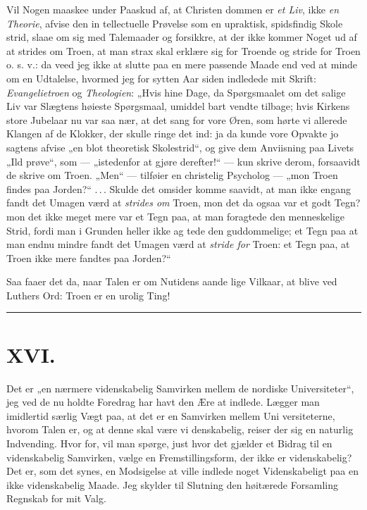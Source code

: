 \documentclass[12pt]{book}
\newcommand{\opage}[1]{\marginnote{\footnotesize\textit{[#1]}}}
\begin{document}
Vil Nogen maaskee under Paaskud af, at Christen\-%
dommen er \emph{et Liv}, ikke \emph{en Theorie}, afvise den in\-%
tellectuelle Prøvelse som en upraktisk, spidsfindig Skole\-%
strid, slaae om sig med Talemaader og forsikkre, at der
ikke kommer Noget ud af at strides om Troen, at man
strax skal erklære sig for Troende og stride for Troen
o. s. v.: da veed jeg ikke at slutte paa en mere passende
Maade end ved at minde om en Udtalelse, hvormed jeg for
sytten Aar siden indledede mit Skrift: \emph{Evangelietroen}
og \emph{Theologien}: „Hvis hine Dage, da Spørgsmaalet om
det salige Liv var Slægtens høieste Spørgsmaal, umiddel\-%
bart vendte tilbage; hvis Kirkens store Jubelaar nu var
saa nær, at det sang for vore Øren, som hørte vi allerede
Klangen af de Klokker, der skulle ringe det ind: ja da
kunde vore Opvakte jo sagtens afvise „en blot theoretisk
\opage{278}\setcounter{footnote}{0}%
Skolestrid“, og give dem Anviisning paa Livets „Ild\-%
prøve“, som --- „istedenfor at gjøre derefter!“ --- kun
skrive derom, forsaavidt de skrive om Troen. „Men“
--- tilføier en christelig Psycholog --- „mon Troen findes
paa Jorden?“ .\,.\,. Skulde det omsider komme saavidt,
at man ikke engang fandt det Umagen værd at \emph{strides
om} Troen, mon det da ogsaa var et godt Tegn? mon det
ikke meget mere var et Tegn paa, at man foragtede den
menneskelige Strid, fordi man i Grunden heller ikke ag\-%
tede den guddommelige; et Tegn paa at man endnu mindre
fandt det Umagen værd at \emph{stride for} Troen: et Tegn
paa, at Troen ikke mere fandtes paa Jorden?“

Saa faaer det da, naar Talen er om Nutidens aande\-%
lige Vilkaar, at blive ved Luthers Ord: Troen er en
urolig Ting!

\begin{center}\rule{3cm}{0.4pt}\end{center}

\chapter*{XVI.}
\label{ch:xvi}
\opage{279}\setcounter{footnote}{0}%
Det er „en nærmere videnskabelig Samvirken mellem de
nordiske Universiteter“, jeg ved de nu holdte Foredrag
har havt den Ære at indlede. Lægger man imidlertid
særlig Vægt paa, at det er en Samvirken mellem Uni\-%
versiteterne, hvorom Talen er, og at denne skal være vi\-%
denskabelig, reiser der sig en naturlig Indvending. Hvor\-%
for, vil man spørge, just hvor det gjælder et Bidrag til
en videnskabelig Samvirken, vælge en Fremstillingsform,
der ikke er videnskabelig? Det er, som det synes, en
Modsigelse at ville indlede noget Videnskabeligt paa en
ikke videnskabelig Maade. Jeg skylder til Slutning den
høitærede Forsamling Regnskab for mit Valg.
\end{document}
